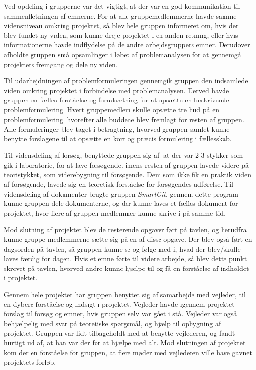 Ved opdeling i grupperne var det vigtigt, at der var en god kommunikation til sammenfletningen af emnerne. For at alle gruppemedlemmerne havde samme vidensniveau omkring projektet, så blev hele gruppen informeret om, hvis der blev fundet ny viden, som kunne dreje projektet i en anden retning, eller hvis informationerne havde indflydelse på de andre arbejdsgruppers emner. Derudover afholdte gruppen små opsamlinger i løbet af problemanalysen for at gennemgå projektets fremgang og dele ny viden.

Til udarbejdningen af problemformuleringen gennemgik gruppen den indsamlede viden omkring projektet i forbindelse med problemanalysen. Derved havde gruppen en fælles forståelse og forudsætning for at opsætte en beskrivende problemformulering. Hvert gruppemedlem skulle opsætte tre bud på en problemformulering, hvorefter alle buddene blev fremlagt for resten af gruppen. Alle formuleringer blev taget i betragtning, hvorved gruppen samlet kunne benytte forslagene til at opsætte en kort og præcis formulering i fællesskab.

Til vidensdeling af forsøg, benyttede gruppen sig af, at der var 2-3 stykker som gik i laboratorie, for at lave forsøgende, imens resten af gruppen lavede videre på teoristykket, som viderebygning til forsøgende. Dem som ikke fik en praktik viden af forsøgende, lavede sig en teoretisk forståelse for forsøgendes udførelse. Til vidensdeling af dokumenter brugte gruppen \textit{SmartGit}, gennem dette program kunne gruppen dele dokumenterne, og der kunne laves et fælles dokument for projektet, hvor flere af gruppen medlemmer kunne skrive i på samme tid.

Mod slutning af projektet blev de resterende opgaver ført på tavlen, og herudfra kunne gruppe medlemmerne sætte sig på en af disse opgave. Der blev også ført en dagsorden på tavlen, så gruppen kunne se og følge med i, hvad der blev/skulle laves færdig for dagen. Hvis et emne førte til videre arbejde, så blev dette punkt skrevet på tavlen, hvorved andre kunne hjælpe til og få en forståelse af indholdet i projektet. 

Gennem hele projektet har gruppen benyttet sig af samarbejde med vejleder, til en dybere forståelse og indsigt i projektet. Vejleder havde igennem projektet forslag til forsøg og emner, hvis gruppen selv var gået i stå. Vejleder var også behjælpelig med svar på teoretiske spørgsmål, og hjælp til opbygning af projektet.  Gruppen var lidt tilbageholdt med at benytte vejlederen, og fandt hurtigt ud af, at han var der for at hjælpe med alt. Mod slutningen af projektet kom der en forståelse for gruppen, at flere møder med vejlederen ville have gavnet projektets forløb.

